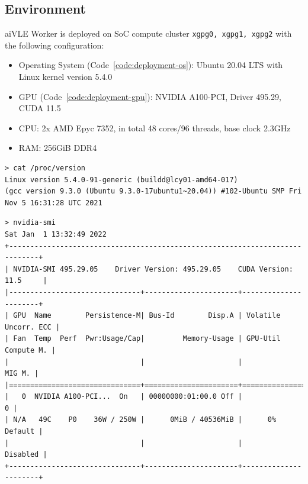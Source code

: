 \subsection{Environment}
\label{ss:deployment-environment}
aiVLE Worker is deployed on SoC compute cluster \texttt{xgpg0, xgpg1, xgpg2} with the following configuration:
\begin{itemize}
    \item Operating System (Code~\ref{code:deployment-os}): Ubuntu 20.04 LTS with Linux kernel version 5.4.0
    \item GPU (Code~\ref{code:deployment-gpu}): NVIDIA A100-PCI, Driver 495.29, CUDA 11.5
    \item CPU: 2x AMD Epyc 7352, in total 48 cores/96 threads, base clock 2.3GHz
    \item RAM: 256GiB DDR4
\end{itemize}

\begin{code}
\begin{verbatim}
> cat /proc/version
Linux version 5.4.0-91-generic (buildd@lcy01-amd64-017) 
(gcc version 9.3.0 (Ubuntu 9.3.0-17ubuntu1~20.04)) #102-Ubuntu SMP Fri Nov 5 16:31:28 UTC 2021
\end{verbatim}
\label{code:deployment-os}
\end{code}

\begin{code}
\begin{verbatim}
> nvidia-smi 
Sat Jan  1 13:32:49 2022       
+-----------------------------------------------------------------------------+
| NVIDIA-SMI 495.29.05    Driver Version: 495.29.05    CUDA Version: 11.5     |
|-------------------------------+----------------------+----------------------+
| GPU  Name        Persistence-M| Bus-Id        Disp.A | Volatile Uncorr. ECC |
| Fan  Temp  Perf  Pwr:Usage/Cap|         Memory-Usage | GPU-Util  Compute M. |
|                               |                      |               MIG M. |
|===============================+======================+======================|
|   0  NVIDIA A100-PCI...  On   | 00000000:01:00.0 Off |                    0 |
| N/A   49C    P0    36W / 250W |      0MiB / 40536MiB |      0%      Default |
|                               |                      |             Disabled |
+-------------------------------+----------------------+----------------------+
\end{verbatim}
\label{code:deployment-gpu}
\end{code}

